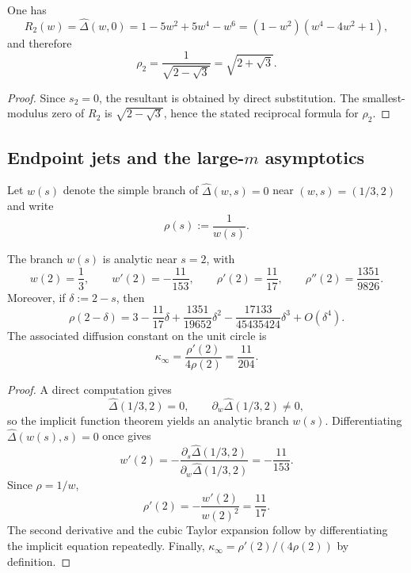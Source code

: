 \begin{corollary}[The worst twist $m=2$]
  \label{cor:rho-m2-closed-form}
  One has
  \[
    R_2(w)=\widehat\Delta(w,0)
    =1-5w^2+5w^4-w^6
    =(1-w^2)(w^4-4w^2+1),
  \]
  and therefore
  \[
    \rho_2=\frac{1}{\sqrt{2-\sqrt3}}=\sqrt{2+\sqrt3}.
  \]
\end{corollary}

\begin{proof}
  Since $s_2=0$, the resultant is obtained by direct substitution. The
  smallest-modulus zero of $R_2$ is $\sqrt{2-\sqrt3}$, hence the stated
  reciprocal formula for $\rho_2$.
\end{proof}

\subsection{Endpoint jets and the large-\texorpdfstring{$m$}{m} asymptotics}

Let $w(s)$ denote the simple branch of $\widehat\Delta(w,s)=0$ near
$(w,s)=(1/3,2)$ and write
\[
  \rho(s):=\frac{1}{w(s)}.
\]

\begin{proposition}
  \label{prop:sync-endpoint-jet}
  The branch $w(s)$ is analytic near $s=2$, with
  \[
    w(2)=\frac13,\qquad
    w'(2)=-\frac{11}{153},\qquad
    \rho'(2)=\frac{11}{17},\qquad
    \rho''(2)=\frac{1351}{9826}.
  \]
  Moreover, if $\delta:=2-s$, then
  \[
    \rho(2-\delta)
    =3-\frac{11}{17}\delta+\frac{1351}{19652}\delta^2
      -\frac{17133}{45435424}\delta^3+O(\delta^4).
  \]
  The associated diffusion constant on the unit circle is
  \[
    \kappa_\infty=\frac{\rho'(2)}{4\rho(2)}=\frac{11}{204}.
  \]
\end{proposition}

\begin{proof}
  A direct computation gives
  \[
    \widehat\Delta(1/3,2)=0,\qquad
    \partial_w\widehat\Delta(1/3,2)\neq 0,
  \]
  so the implicit function theorem yields an analytic branch $w(s)$.
  Differentiating $\widehat\Delta(w(s),s)=0$ once gives
  \[
    w'(2)
    =-\frac{\partial_s\widehat\Delta(1/3,2)}
            {\partial_w\widehat\Delta(1/3,2)}
    =-\frac{11}{153}.
  \]
  Since $\rho=1/w$,
  \[
    \rho'(2)=-\frac{w'(2)}{w(2)^2}=\frac{11}{17}.
  \]
  The second derivative and the cubic Taylor expansion follow by
  differentiating the implicit equation repeatedly. Finally,
  $\kappa_\infty=\rho'(2)/(4\rho(2))$ by definition.
\end{proof}

